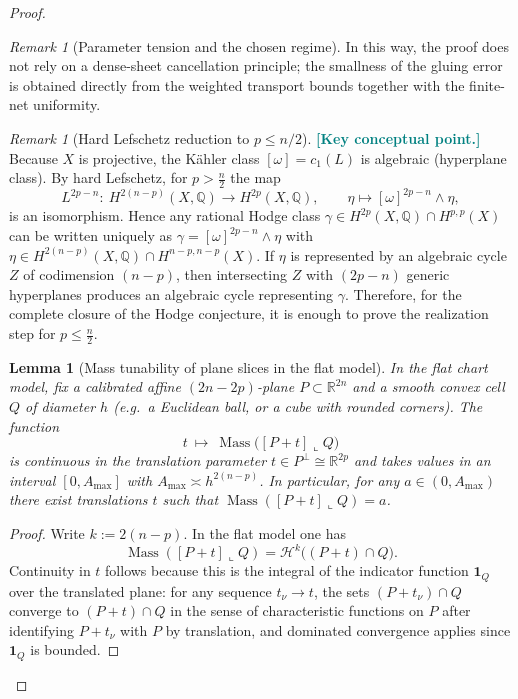 \documentclass[11pt]{article}
\newcommand{\REVMZ}[1]{\textcolor{teal}{#1}}  %
\numberwithin{equation}{section}  %
\theoremstyle{plain}
\newtheorem{lemma}[theorem]{Lemma}
\theoremstyle{definition}
\theoremstyle{remark}
\newtheorem{remark}[theorem]{Remark}
\newcommand{\R}{\mathbb{R}}
\newcommand{\Q}{\mathbb{Q}}
\DeclareMathOperator{\Mass}{Mass}
\begin{document}
\begin{proof}
\begin{remark}[Parameter tension and the chosen regime]
In this way, the proof does not rely on a dense-sheet cancellation principle; the smallness of the gluing error is obtained directly from the weighted transport bounds together with the finite-net uniformity.

\end{remark}
\begin{remark}[Hard Lefschetz reduction to $p\le n/2$]\label{rem:lefschetz-reduction} \cite[Ch.~6]{Voisin02}
\REVMZ{\textbf{[Key conceptual point.]}}
Because $X$ is projective, the K\"ahler class $[\omega]=c_1(L)$ is algebraic (hyperplane class).
By hard Lefschetz, for $p>\frac{n}{2}$ the map
\[
L^{2p-n}:\ H^{2(n-p)}(X,\Q)\longrightarrow H^{2p}(X,\Q),\qquad \eta\mapsto [\omega]^{2p-n}\wedge \eta,
\]
is an isomorphism.  Hence any rational Hodge class $\gamma\in H^{2p}(X,\Q)\cap H^{p,p}(X)$ can be written uniquely as
$\gamma=[\omega]^{2p-n}\wedge\eta$ with $\eta\in H^{2(n-p)}(X,\Q)\cap H^{n-p,n-p}(X)$.
If $\eta$ is represented by an algebraic cycle $Z$ of codimension $(n-p)$, then intersecting $Z$ with $(2p-n)$ generic hyperplanes produces
an algebraic cycle representing $\gamma$.
Therefore, for the complete closure of the Hodge conjecture, it is enough to prove the realization step for $p\le \frac{n}{2}$.
\end{remark}



\begin{lemma}[Mass tunability of plane slices in the flat model]\label{lem:mass-tunable}
In the flat chart model, fix a calibrated affine $(2n-2p)$-plane $P\subset\R^{2n}$ and a \emph{smooth convex} cell $Q$ of diameter $h$
(e.g.\ a Euclidean ball, or a cube with rounded corners).
The function
\[
t\ \longmapsto\ \Mass\big([P+t]\llcorner Q\big)
\]
is continuous in the translation parameter $t\in P^\perp\cong\R^{2p}$ and takes values in an interval $[0,A_{\max}]$ with $A_{\max}\asymp h^{2(n-p)}$.
In particular, for any $a\in(0,A_{\max})$ there exist translations $t$ such that $\Mass([P+t]\llcorner Q)=a$.
\end{lemma}


\begin{proof}
Write $k:=2(n-p)$.  In the flat model one has
\[
\Mass([P+t]\llcorner Q)=\mathcal H^{k}\bigl((P+t)\cap Q\bigr).
\]
Continuity in $t$ follows because this is the integral of the indicator function $\mathbf 1_Q$ over the translated plane:
for any sequence $t_\nu\to t$, the sets $(P+t_\nu)\cap Q$ converge to $(P+t)\cap Q$ in the sense of characteristic functions on $P$
after identifying $P+t_\nu$ with $P$ by translation, and dominated convergence applies since $\mathbf 1_Q$ is bounded.


\end{proof}
\end{proof}
\end{document}

